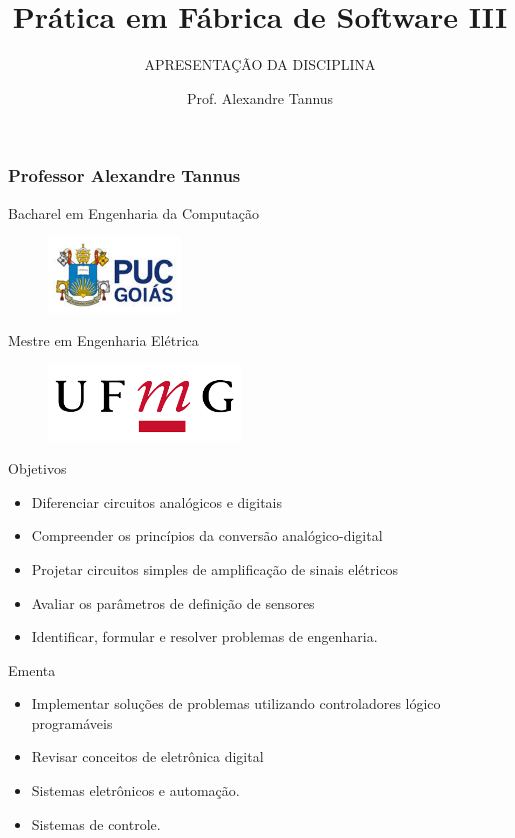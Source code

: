 \documentclass[aspectratio=169,
				xcolor=table]{beamer}
\institute[]{\uppercase{Engenharia da Computação}}
\title[]{Prática em Fábrica de Software III}
\subtitle[]{\uppercase{Apresentação da Disciplina}}
\author[]{Prof. Alexandre Tannus}
\date{}
\begin{document}
	\begin{frame}
		\titlepage
	\end{frame}
	
	\begin{frame}
		\frametitle{Professor Alexandre Tannus}
		\centering
			\huge Bacharel em Engenharia da Computação
			\begin{figure}
			\centering	\includegraphics[height=2cm, keepaspectratio]{../figs/puc.jpg} 			
			\end{figure}
			\huge Mestre em Engenharia Elétrica
			\begin{figure}
			\centering	\includegraphics[height=2cm, keepaspectratio]{../figs/ufmg} 		
			\end{figure}
	\end{frame}
	
	\begin{frame}[allowframebreaks]{Objetivos}
		\begin{itemize}

			\item Diferenciar circuitos analógicos e digitais
			\vspace{1em}
			\item Compreender os princípios da conversão analógico-digital
			\vspace{1em}
			\item Projetar circuitos simples de amplificação de sinais elétricos
			\vspace{1em}
			\item Avaliar os parâmetros de definição de sensores
			\vspace{1em}
			\item Identificar, formular e resolver problemas de engenharia.

		\end{itemize}
	\end{frame}

	\begin{frame}[allowframebreaks]{Ementa}
		\begin{itemize}
			\item Implementar soluções de problemas utilizando controladores lógico programáveis
			\vspace{1em}
			\item Revisar conceitos de eletrônica digital
			\item Sistemas eletrônicos e automação.
			\vspace{1em}
			\item Sistemas de controle.  
		\end{itemize}
	\end{frame}
	
\end{document}
